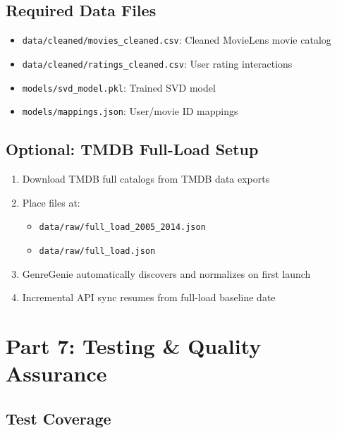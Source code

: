 \documentclass[11pt,a4paper]{article}
\begin{document}
\subsection{Required Data Files}

\begin{itemize}
    \item \texttt{data/cleaned/movies\_cleaned.csv}: Cleaned MovieLens movie catalog
    \item \texttt{data/cleaned/ratings\_cleaned.csv}: User rating interactions
    \item \texttt{models/svd\_model.pkl}: Trained SVD model
    \item \texttt{models/mappings.json}: User/movie ID mappings
\end{itemize}

\subsection{Optional: TMDB Full-Load Setup}

\begin{enumerate}
    \item Download TMDB full catalogs from TMDB data exports
    \item Place files at:
    \begin{itemize}
        \item \texttt{data/raw/full\_load\_2005\_2014.json}
        \item \texttt{data/raw/full\_load.json}
    \end{itemize}
    \item GenreGenie automatically discovers and normalizes on first launch
    \item Incremental API sync resumes from full-load baseline date
\end{enumerate}


\section{Part 7: Testing \& Quality Assurance}

\subsection{Test Coverage}
\end{document}
